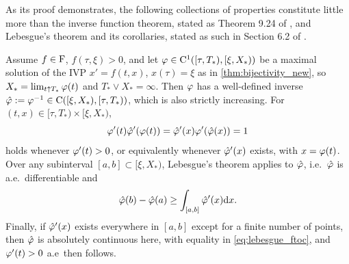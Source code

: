 As its proof demonstrates, the following collections of properties constitute little more than the inverse function theorem, stated as Theorem 9.24 of \cite{rudin_1976}, and Lebesgue's theorem and its corollaries, stated as such in Section 6.2 of \cite{royden_2010}.

\begin{lemma}\label{lem:inverse_properties}
    Assume $f\in\mathrm{F}$, $f(\tau,\xi)>0$, and let $\varphi\in\mathrm{C}^1([\tau,T_*),[\xi,X_*))$ be a maximal solution of the IVP $x'=f(t,x)$, $x(\tau)=\xi$ as in \autoref{thm:bijectivity_new}, so $X_*=\lim_{t\uparrow T_*}\varphi(t)$ and $T_*\vee X_*=\infty$. Then $\varphi$ has a well-defined inverse $\hat{\varphi}:=\varphi^{-1}\in\mathrm{C}([\xi,X_*),[\tau,T_*))$, which is also strictly increasing. For $(t,x)\in[\tau,T_*)\times[\xi,X_*)$,~
    \begin{equation}\label{eq:inv_func_thm}
        \varphi'(t)\hat{\varphi}'(\varphi(t)) = \hat{\varphi}'(x)\varphi'(\hat{\varphi}(x)) = 1
    \end{equation}
    holds whenever $\varphi'(t)>0$, or equivalently whenever $\hat{\varphi}'(x)$ exists, with $x=\varphi(t)$. Over any subinterval $[a,b]\subset[\xi,X_*)$, Lebesgue's theorem applies to $\hat{\varphi}$, i.e.~$\hat{\varphi}$ is a.e.~differentiable and
    \begin{equation}\label{eq:lebesgue_ftoc}
        \hat{\varphi}(b) - \hat{\varphi}(a) \ge \int_{[a,b]}\hat{\varphi}'(x)\mathrm{d} x.
    \end{equation}
    Finally, if $\hat{\varphi}'(x)$ exists everywhere in $[a,b]$ except for a finite number of points, then $\hat{\varphi}$ is absolutely continuous here, with equality in \autoref{eq:lebesgue_ftoc}, and $\varphi'(t)>0$ a.e~then follows.
\end{lemma}
